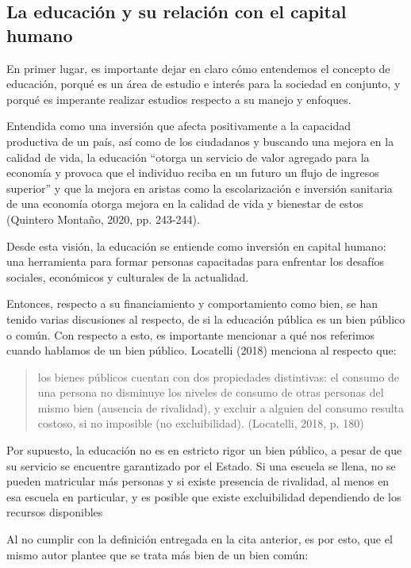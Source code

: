\documentclass[
  12pt,
  letterpaper,
]{article}
\begin{document}
\subsection{La educación y su relación con el capital humano}\label{la-educaciuxf3n-y-su-relaciuxf3n-con-el-capital-humano}

En primer lugar, es importante dejar en claro cómo entendemos el concepto de educación, porqué es un área de estudio e interés para la sociedad en conjunto, y porqué es imperante realizar estudios respecto a su manejo y enfoques.

Entendida como una inversión que afecta positivamente a la capacidad productiva de un país, así como de los ciudadanos y buscando una mejora en la calidad de vida, la educación ``otorga un servicio de valor agregado para la economía y provoca que el individuo reciba en un futuro un flujo de ingresos superior'' y que la mejora en aristas como la escolarización e inversión sanitaria de una economía otorga mejora en la calidad de vida y bienestar de estos (Quintero Montaño, 2020, pp. 243-244).

Desde esta visión, la educación se entiende como inversión en capital humano: una herramienta para formar personas capacitadas para enfrentar los desafíos sociales, económicos y culturales de la actualidad.

Entonces, respecto a su financiamiento y comportamiento como bien, se han tenido varias discusiones al respecto, de si la educación pública es un bien público o común.
Con respecto a esto, es importante mencionar a qué nos referimos cuando hablamos de un bien público.
Locatelli (2018) menciona al respecto que:

\begin{quote}
los bienes públicos cuentan con dos propiedades distintivas: el consumo de una persona no disminuye los niveles de consumo de otras personas del mismo bien (ausencia de rivalidad), y excluir a alguien del consumo resulta costoso, si no imposible (no excluibilidad).
(Locatelli, 2018, p. 180)
\end{quote}

Por supuesto, la educación no es en estricto rigor un bien público, a pesar de que su servicio se encuentre garantizado por el Estado.
Si una escuela se llena, no se pueden matricular más personas y si existe presencia de rivalidad, al menos en esa escuela en particular, y es posible que existe excluibilidad dependiendo de los recursos disponibles

Al no cumplir con la definición entregada en la cita anterior, es por esto, que el mismo autor plantee que se trata más bien de un bien común:
\end{document}
